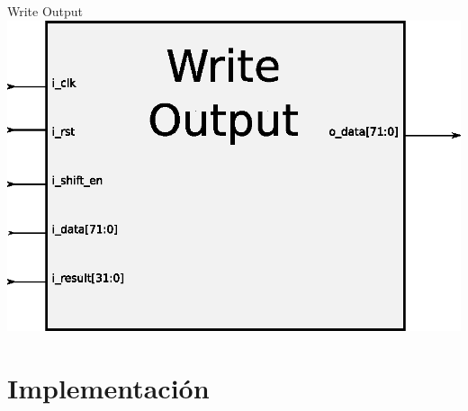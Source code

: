 \documentclass[xcolor=dvipsnames]{beamer}
\begin{document}
\begin{frame}{Write Output}
\center 
\includegraphics[scale=0.60]{figures/bloqwrite.eps}
\end{frame}

\section{Implementación}
\end{document}
